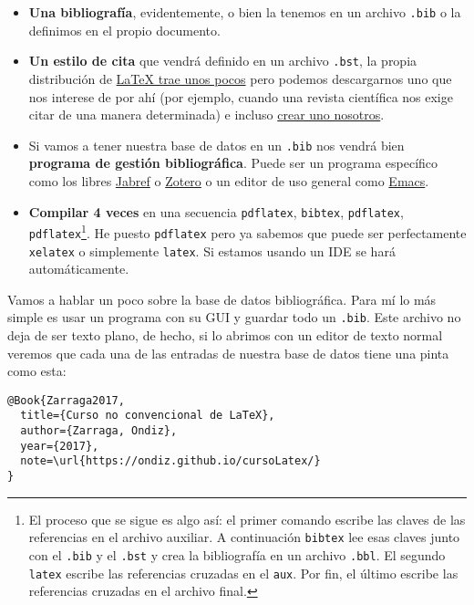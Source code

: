 \begin{itemize}
\item
  \textbf{Una bibliografía}, evidentemente, o bien la tenemos en un
  archivo \lstinline!.bib! o la definimos en el propio documento.
\item
  \textbf{Un estilo de cita} que vendrá definido en un archivo
  \lstinline!.bst!, la propia distribución de
  \href{https://www.sharelatex.com/learn/Bibtex_bibliography_styles}{LaTeX
  trae unos pocos} pero podemos descargarnos uno que nos interese de por
  ahí (por ejemplo, cuando una revista científica nos exige citar de una
  manera determinada) e incluso
  \href{http://ctan.org/pkg/custom-bib}{crear uno nosotros}.
\item
  Si vamos a tener nuestra base de datos en un \lstinline!.bib! nos
  vendrá bien \textbf{programa de gestión bibliográfica}. Puede ser un
  programa específico como los libres
  \href{http://www.jabref.org/}{Jabref} o
  \href{https://www.zotero.org/}{Zotero} o un editor de uso general como
  \href{https://nickhigham.wordpress.com/2016/01/06/managing-bibtex-files-with-emacs/}{Emacs}.
\item
  \textbf{Compilar 4 veces} en una secuencia \lstinline!pdflatex!,
  \lstinline!bibtex!, \lstinline!pdflatex!,
  \lstinline!pdflatex!\footnote{El proceso que se sigue es algo así: el
    primer comando escribe las claves de las referencias en el archivo
    auxiliar. A continuación \lstinline!bibtex! lee esas claves junto
    con el \lstinline!.bib! y el \lstinline!.bst! y crea la bibliografía
    en un archivo \lstinline!.bbl!. El segundo \lstinline!latex! escribe
    las referencias cruzadas en el \lstinline!aux!. Por fin, el último
    escribe las referencias cruzadas en el archivo final.}. He puesto
  \lstinline!pdflatex! pero ya sabemos que puede ser perfectamente
  \lstinline!xelatex! o simplemente \lstinline!latex!. Si estamos usando
  un IDE se hará automáticamente.
\end{itemize}

Vamos a hablar un poco sobre la base de datos bibliográfica. Para mí lo
más simple es usar un programa con su GUI y guardar todo un
\lstinline!.bib!. Este archivo no deja de ser texto plano, de hecho, si
lo abrimos con un editor de texto normal veremos que cada una de las
entradas de nuestra base de datos tiene una pinta como esta:

\begin{lstlisting}[language={[latex]tex}]
@Book{Zarraga2017,
  title={Curso no convencional de LaTeX},
  author={Zarraga, Ondiz},
  year={2017},
  note=\url{https://ondiz.github.io/cursoLatex/}
}
\end{lstlisting}

